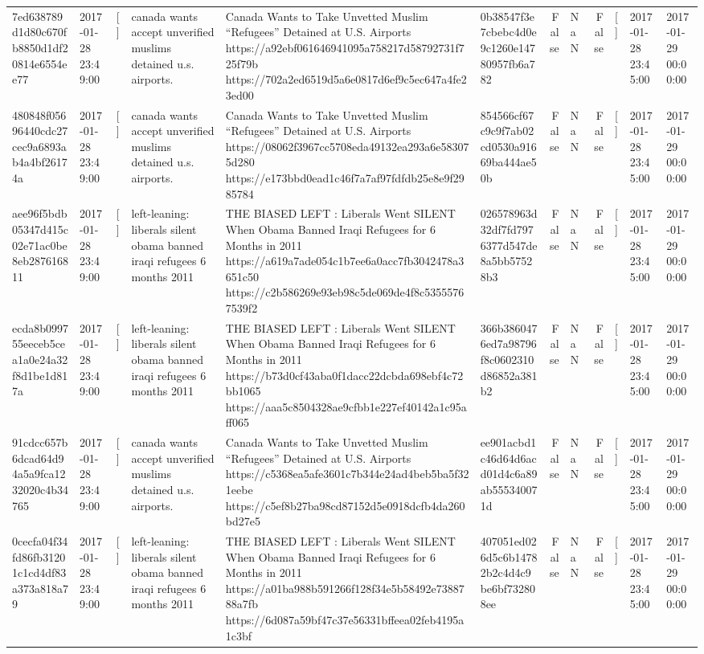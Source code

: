\begin{tabular}{llllllrlrlll}
7ed638789d1d80c670fb8850d1df20814e6554ee77 & 2017-01-28 23:49:00 & [] & canada wants accept unverified muslims detained u.s. airports. & Canada Wants to Take Unvetted Muslim “Refugees” Detained at U.S. Airports https://a92ebf061646941095a758217d58792731f725f79b https://702a2ed6519d5a6e0817d6ef9c5ec647a4fe23ed00 & 0b38547f3e7cbebc4d0e9c1260e14780957fb6a782 & False & NaN & False & [] & 2017-01-28 23:45:00 & 2017-01-29 00:00:00 \\
480848f05696440cdc27cec9a6893ab4a4bf26174a & 2017-01-28 23:49:00 & [] & canada wants accept unverified muslims detained u.s. airports. & Canada Wants to Take Unvetted Muslim “Refugees” Detained at U.S. Airports https://08062f3967cc5708eda49132ea293a6e583075d280 https://e173bbd0ead1c46f7a7af97fdfdb25e8e9f2985784 & 854566cf67c9c9f7ab02cd0530a91669ba444ae50b & False & NaN & False & [] & 2017-01-28 23:45:00 & 2017-01-29 00:00:00 \\
aee96f5bdb05347d415c02e71ac0be8eb287616811 & 2017-01-28 23:49:00 & [] & left-leaning: liberals silent obama banned iraqi refugees 6 months 2011 & THE BIASED LEFT : Liberals Went SILENT When Obama Banned Iraqi Refugees for 6 Months in 2011 https://a619a7ade054c1b7ee6a0acc7fb3042478a3651c50 https://c2b586269e93eb98c5de069de4f8c53555767539f2 & 026578963d32df7fd7976377d547de8a5bb57528b3 & False & NaN & False & [] & 2017-01-28 23:45:00 & 2017-01-29 00:00:00 \\
ecda8b099755eeceb5cea1a0e24a32f8d1be1d817a & 2017-01-28 23:49:00 & [] & left-leaning: liberals silent obama banned iraqi refugees 6 months 2011 & THE BIASED LEFT : Liberals Went SILENT When Obama Banned Iraqi Refugees for 6 Months in 2011 https://b73d0cf43aba0f1dacc22dcbda698ebf4c72bb1065 https://aaa5c8504328ae9cfbb1e227ef40142a1c95aff065 & 366b3860476ed7a98796f8c0602310d86852a381b2 & False & NaN & False & [] & 2017-01-28 23:45:00 & 2017-01-29 00:00:00 \\
91cdcc657b6dcad64d94a5a9fca1232020c4b34765 & 2017-01-28 23:49:00 & [] & canada wants accept unverified muslims detained u.s. airports. & Canada Wants to Take Unvetted Muslim “Refugees” Detained at U.S. Airports https://c5368ea5afe3601c7b344e24ad4beb5ba5f321eebe https://c5ef8b27ba98cd87152d5e0918dcfb4da260bd27e5 & ee901acbd1c46d64d6acd01d4c6a89ab555340071d & False & NaN & False & [] & 2017-01-28 23:45:00 & 2017-01-29 00:00:00 \\
0cecfa04f34fd86fb31201c1cd4df83a373a818a79 & 2017-01-28 23:49:00 & [] & left-leaning: liberals silent obama banned iraqi refugees 6 months 2011 & THE BIASED LEFT : Liberals Went SILENT When Obama Banned Iraqi Refugees for 6 Months in 2011 https://a01ba988b591266f128f34e5b58492e7388788a7fb https://6d087a59bf47c37e56331bffeea02feb4195a1c3bf & 407051ed026d5c6b14782b2c4d4c9be6bf732808ee & False & NaN & False & [] & 2017-01-28 23:45:00 & 2017-01-29 00:00:00 \\

\end{tabular}
